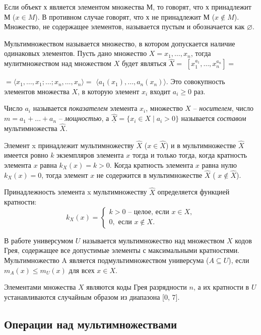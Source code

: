 \documentclass[14pt,a4paper]{extreport}
\begin{document}
Если объект х является элементом множества М, то говорят, что х принадлежит М ($ x \in M$). В противном случае говорят, что х не принадлежит М ($x \notin M$).
Множество, не содержащее элементов, называется пустым и обозначается как $\varnothing$.

Мультимножеством называется множество, в котором допускается наличие одинаковых элементов. 
Пусть дано множество $X = {x_1, \dots, x_n}$, тогда мулитмножеством над множеством $X$ будет являться $\widehat{X} = $
$ [x_1^{a_1}, \dots, x_n^{a_n}] = $ 

\noindent $= \langle x_1, \dots, x_1; \dots; x_n, \dots, x_n \rangle = $ $ \langle a_1(x_1), \dots, a_n(x_n) \rangle. $
Это совокупность элементов множества $X$, в которую элемент $x_i$ входит $a_i \geqslant 0$ раз.

Число \(a_i\) называется \textit{показателем} элемента \(x_i\), множество \(X\) -- \textit{носителем}, число \(m = a_1 + \dots + a_n\) -- \textit{мощностью}, а \({\underline{\widehat{X}}} = \{x_i \in X \mid a_i > 0\}\) называется \textit{составом} мультимножества \(\widehat{X}\).

Элемент x принадлежит мультимножеству $\widehat{X}$ ($x \in \widehat{X}$) и в мультимножестве $\widehat{X}$ имеется ровно $k$ экземпляров элемента $x$ тогда и только тогда, когда кратность элемента $x$ равна $k_X(x) = k > 0$. Когда кратность элемента $x$ равна нулю $k_X(x) = 0$, тогда элемент $x$ не содержится в мультимножестве $\widehat{X}$ ( $x \notin \widehat{X}$).

Принадлежность элемента x мультимножеству $\widehat{X}$ определяется функцией кратности:
\[
k_X(x) = 
\begin{cases}
k > 0 \text{ -- целое, если } x \in X, \\
0, \text{ если } x \notin X.
\end{cases}
\]

В работе универсумом $U$ называется мультимножество над множеством $X$ кодов Грея, содержащее все допустимые элементы с максимальными кратностями. Мультимножество A является подмультимножеством
универсума ($A \subseteq U$), если
$m_A(x) \leqslant m_U (x)$ для всех $x \in X$.

Элементами множества $X$ являются коды Грея разрядности $n$, а их кратности в $U$ устанавливаются случайным образом из диапазона [0, 7].

\subsection{Операции над мультимножествами}
\end{document}
